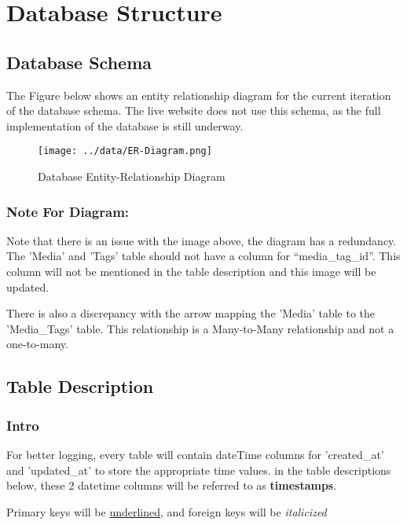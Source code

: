 \documentclass{scrreprt}
\begin{document}
\chapter{Database Structure}

\section{Database Schema}

The Figure below shows an entity relationship diagram for the current iteration
of the database schema. The live website does not use this schema, as the full
implementation of the database is still underway.

\begin{figure}[!ht]
    \caption{Database Entity-Relationship Diagram}
    \label{erDiagram}
	\centering
	\texttt{[image: ../data/ER-Diagram.png]}
\end{figure}

\subsection{Note For Diagram:}

Note that there is an issue with the image above, the diagram has a redundancy.
The 'Media' and 'Tags' table should not have a column for ``media\_tag\_id''.
This column will not be mentioned in the table description and this image will
be updated.

There is also a discrepancy with the arrow mapping the 'Media' table to the
'Media\_Tags' table. This relationship is a Many-to-Many relationship and not a
one-to-many.


\section{Table Description}

\subsection{Intro}

For better logging, every table will contain dateTime columns for 'created\_at'
and 'updated\_at' to store the appropriate time values. in the table
descriptions below, these 2 datetime columns will be referred to as
\textbf{timestamps}.

Primary keys will be \underline{underlined}, and foreign keys will be
\textit{italicized}
\end{document}
